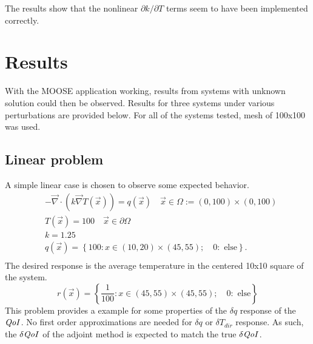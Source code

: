 \documentclass{article}
\newcommand{\vx}{\vec{x}}
\renewcommand{\div}{\vec{\nabla} \cdot}
\newcommand{\grad}{\vec{\nabla}}
\newcommand{\qoi}{{\it QoI}\xspace}
\newcommand{\Tdir}{T_{dir}}
\begin{document}
The results show that the nonlinear $\partial k / \partial T$ terms seem to have been implemented correctly.

\section{Results}

With the MOOSE application working, results from systems with unknown solution could then be observed. Results for three systems under various perturbations are provided below. For all of the systems tested, mesh of 100x100 was used.

\subsection{Linear problem}
A simple linear case is chosen to observe some expected behavior.
\begin{equation}
\label{case1}
\begin{split}
& - \div ( k \grad T(\vx) ) = q(\vx) \quad \vx \in \Omega := (0,100) \times (0,100) \\
&T(\vx)=100 \quad \vx \in \partial \Omega \\
& k = 1.25 \\
& q(\vx) = \left\lbrace 100: x \in (10,20) \times (45,55); \quad 0: \text{ else} \right\rbrace.\\
\end{split}
\end{equation}
The desired response is the average temperature in the centered 10x10 square of the system.
\begin{equation}
r(\vx) = \left\lbrace \frac{1}{100}: x \in (45,55) \times (45,55); \quad 0: \text{ else} \right\rbrace
\end{equation}
This problem provides a example for some properties of the $\delta q$ response of the $\qoi$. No first order approximations are needed for $\delta q$ or $\delta \Tdir$ response. As such, the $\delta \qoi$ of the adjoint method is expected to match the true $\delta \qoi$. 
\end{document}
